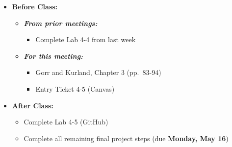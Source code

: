 \documentclass[
]{book}
\providecommand{\tightlist}{%
  \setlength{\itemsep}{0pt}\setlength{\parskip}{0pt}}
\begin{document}
\begin{itemize}
\tightlist
\item
  \textbf{Before Class:}

  \begin{itemize}
  \tightlist
  \item
    \textbf{\emph{From prior meetings:}}

    \begin{itemize}
    \tightlist
    \item
      Complete Lab 4-4 from last week
    \end{itemize}
  \item
    \textbf{\emph{For this meeting:}}

    \begin{itemize}
    \tightlist
    \item
      Gorr and Kurland, Chapter 3 (pp.~83-94)
    \item
      Entry Ticket 4-5 (Canvas)
    \end{itemize}
  \end{itemize}
\item
  \textbf{After Class:}

  \begin{itemize}
  \tightlist
  \item
    Complete Lab 4-5 (GitHub)
  \item
    Complete all remaining final project steps (due \textbf{Monday, May 16})
  \end{itemize}
\end{itemize}

  
\end{document}
